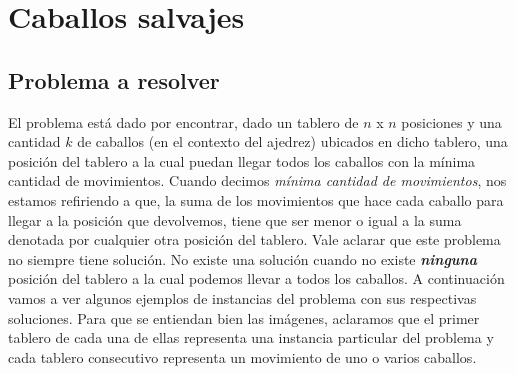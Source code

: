 \documentclass[a4paper]{article}
\begin{document}
\section{Caballos salvajes}
\subsection{Problema a resolver}
El problema est\'a dado por encontrar, dado un tablero de $n$ x $n$ posiciones y una cantidad $k$ de caballos (en el contexto del ajedrez) ubicados en dicho tablero, una posición del tablero a la cual puedan llegar todos los caballos con la mínima cantidad de movimientos. Cuando decimos \textit{m\'inima cantidad de movimientos}, nos estamos refiriendo a que, la suma de los movimientos que hace cada caballo para llegar a la posici\'on que devolvemos, tiene que ser menor o igual a la suma denotada por cualquier otra posición del tablero.
\newline Vale aclarar que este problema no siempre tiene solución. No existe una solución cuando no existe \textit{\textbf{ninguna}} posición del tablero a la cual podemos llevar a todos los caballos.
\newline A continuación vamos a ver algunos ejemplos de instancias del problema con sus respectivas soluciones. Para que se entiendan bien las imágenes, aclaramos que el primer tablero de cada una de ellas representa una instancia particular del problema y cada tablero consecutivo representa un movimiento de uno o varios caballos.
\end{document}
